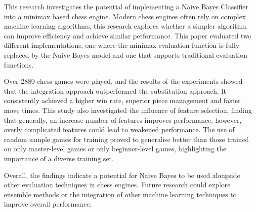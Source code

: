 This research investigates the potential of implementing a Naive Bayes Classifier into a minimax based chess engine. Modern chess engines often rely on complex machine learning algorithms, this research explores whether a simpler algorithm can improve efficiency and achieve similar performance. This paper evaluated two different implementations, one where the minimax evaluation function is fully replaced by the Naive Bayes model and one that supports traditional evaluation functions. 

Over 2880 chess games were played, and the results of the experiments showed that the integration approach outperformed the substitution approach. It consistently achieved a higher win rate, superior piece management and faster move times. This study also investigated the influence of feature selection, finding that generally, an increase number of features improves performance, however, overly complicated features could lead to weakened performance. The use of random sample games for training proved to generalise better than those trained on only master-level games or only beginner-level games, highlighting the importance of a diverse training set. 

Overall, the findings indicate a potential for Naive Bayes to be used alongside other evaluation techniques in chess engines. Future research could explore ensemble methods or the integration of other machine learning techniques to improve overall performance.